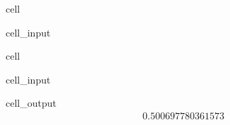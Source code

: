 \documentclass[letterpaper,10pt,english]{jupyterBook}
\begin{document}
\begin{sphinxuseclass}{cell}\begin{sphinxVerbatimInput}

\begin{sphinxuseclass}{cell_input}
\begin{sphinxVerbatim}[commandchars=\\\{\}]
\PYG{p}{[}\PYG{p}{]}\PYG{p}{[}\PYG{p}{]}
\end{sphinxVerbatim}

\end{sphinxuseclass}\end{sphinxVerbatimInput}

\end{sphinxuseclass}
\begin{sphinxuseclass}{cell}\begin{sphinxVerbatimInput}

\begin{sphinxuseclass}{cell_input}
\begin{sphinxVerbatim}[commandchars=\\\{\}]
\end{sphinxVerbatim}

\end{sphinxuseclass}\end{sphinxVerbatimInput}
\begin{sphinxVerbatimOutput}

\begin{sphinxuseclass}{cell_output}\begin{equation*}
\begin{split}0.500697780361573\end{split}
\end{equation*}
\end{sphinxuseclass}\end{sphinxVerbatimOutput}

\end{sphinxuseclass}
\end{document}
